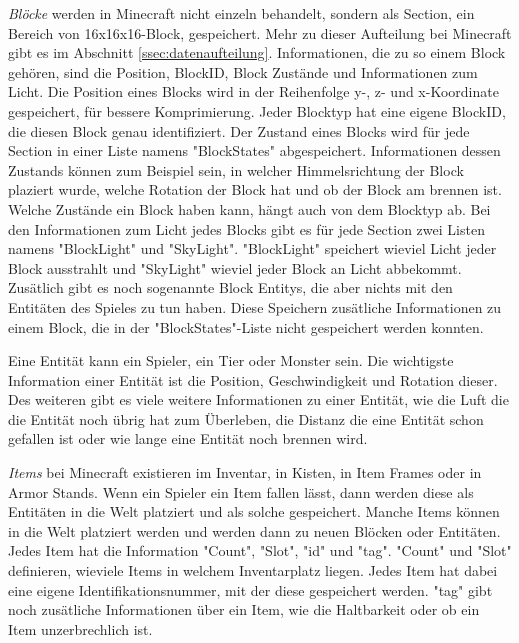 \textit{Blöcke} werden in Minecraft nicht einzeln behandelt, sondern als Section, ein Bereich von 16x16x16-Block, gespeichert. Mehr zu dieser Aufteilung bei Minecraft gibt es im Abschnitt \ref{ssec:datenaufteilung}. Informationen, die zu so einem Block gehören, sind die Position, BlockID, Block Zustände und Informationen zum Licht. Die Position eines Blocks wird in der Reihenfolge y-, z- und x-Koordinate gespeichert, für bessere Komprimierung. Jeder Blocktyp hat eine eigene BlockID, die diesen Block genau identifiziert. Der Zustand eines Blocks wird für jede Section in einer Liste namens "BlockStates" abgespeichert. Informationen dessen Zustands können zum Beispiel sein, in welcher Himmelsrichtung der Block plaziert wurde, welche Rotation der Block hat und ob der Block am brennen ist. Welche Zustände ein Block haben kann, hängt auch von dem Blocktyp ab.\cite{minecraftBlockStates} Bei den Informationen zum Licht jedes Blocks gibt es für jede Section zwei Listen namens "BlockLight" und "SkyLight". "BlockLight" speichert wieviel Licht jeder Block ausstrahlt und "SkyLight" wieviel jeder Block an Licht abbekommt. Zusätlich gibt es noch sogenannte Block Entitys, die aber nichts mit den Entitäten des Spieles zu tun haben. Diese Speichern zusätliche Informationen zu einem Block, die in der "BlockStates"-Liste nicht gespeichert werden konnten.\cite{minecraftChunkFormat}

Eine Entität kann ein Spieler, ein Tier oder Monster sein. Die wichtigste Information einer Entität ist die Position, Geschwindigkeit und Rotation dieser. Des weiteren gibt es viele weitere Informationen zu einer Entität, wie die Luft die die Entität noch übrig hat zum Überleben, die Distanz die eine Entität schon gefallen ist oder wie lange eine Entität noch brennen wird.\cite{minecraftEntityFormat}


\textit{Items} bei Minecraft existieren im Inventar, in Kisten, in Item Frames oder in Armor Stands. Wenn ein Spieler ein Item fallen lässt, dann werden diese als Entitäten in die Welt platziert und als solche gespeichert. Manche Items können in die Welt platziert werden und werden dann zu neuen Blöcken oder Entitäten. Jedes Item hat die Information "Count", "Slot", "id" und "tag". "Count" und "Slot" definieren, wieviele Items in welchem Inventarplatz liegen. Jedes Item hat dabei eine eigene Identifikationsnummer, mit der diese gespeichert werden. "tag" gibt noch zusätliche Informationen über ein Item, wie die Haltbarkeit oder ob ein Item unzerbrechlich ist.
\cite{minecraftPlayerdatFormat}
\cite{minecraftItem}

